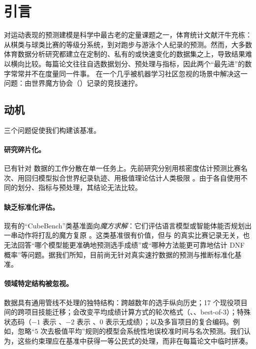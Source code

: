 \section{引言}
\label{sec:intro}

对运动表现的预测建模是科学中最古老的定量课题之一，体育统计文献汗牛充栋：从棋类与球类比赛的等级分系统，到对跑步与游泳个人纪录的预测。然而，大多数体育数据分析研究都建立在定制的、私有的或快速变化的数据集之上，导致结果难以横向比较。每篇论文往往自选数据划分、预处理与指标，因此两个“最先进”的数字常常并不在度量同一件事。\wcabench{} 在一个几乎被机器学习社区忽视的场景中解决这一问题：由世界魔方协会（\wca）记录的竞技速拧。

\subsection{动机}
\label{sec:motivation}

三个问题促使我们构建该基准。

\paragraph{研究碎片化。}已有针对 \wca{} 数据的工作分散在单一任务上。先前研究分别用核密度估计预测比赛名次、用回归模型拟合世界纪录轨迹、用极值理论估计人类极限 \citep{glickman_rating, tatem_sprint, evt_coles}。由于各自使用不同的划分、指标与预处理，其结论无法比较。

\paragraph{缺乏标准化评估。}现有的“CubeBench”类基准面向\emph{魔方求解}：它们评估语言模型或智能体能否规划出一串动作将打乱的魔方复原 \citep{cubebench, cube_bench_mllm}。这类基准很有价值，但与 \wca{} 的真实比赛记录无关，也无法回答“哪个模型能更准确地预测选手成绩”或“哪种方法能更可靠地估计 DNF 概率”等问题。据我们所知，目前尚无针对真实速拧数据的预测与推断标准化基准。

\paragraph{领域特定结构被忽视。}\wca{} 数据具有通用管线不处理的独特结构：跨越数年的选手纵向历史；17 个现役项目间的跨项目技能迁移；会改变平均成绩计算方式的轮次格式（、、best-of-3）；特殊状态码（$-1$ 表示 \DNF{}、$-2$ 表示 \DNS{}、$0$ 表示无成绩）；以及多盲项目的复合编码。例如，忽略“5 次去极值平均”规则的模型会系统性地误校准时间与名次预测。我们认为，这些约束理应在基准中获得一等公民式的处理，而非在每篇论文中临时拼凑。

